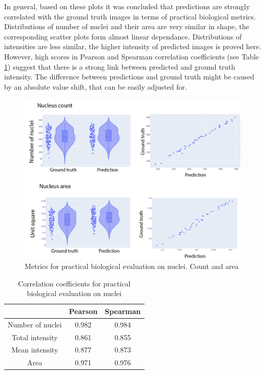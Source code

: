 In general, based on these plots it was concluded that predictions are strongly correlated with the ground truth images in terms of practical biological metrics. Distributions of number of nuclei and their area are very similar in shape, the corresponding scatter plots form almost linear dependance. Distributions of intensities are less similar, the higher intensity of predicted images is proved here. However, high scores in Pearson and Spearman correlation coefficients (see Table \ref{table:nuclei-downstream-metrics-coefficients}) suggest that there is a strong link between predicted and ground truth intensity. The difference between predictions and ground truth might be caused by an absolute value shift, that can be easily adjusted for.

\begin{figure}[htb]
	\begin{center}
		\includegraphics[width=0.8\linewidth]{bilder/nuclei/metric/combined-metrics-1.png}
		\caption{Metrics for practical biological evaluation on nuclei. Count and area}\label{fig:nuclei-downstream-metrics-2}
	\end{center}
\end{figure}

\begin{table}[htb]
    \centering
    \caption{Correlation coefficients for practical biological evaluation on nuclei}
        \begin{adjustbox}{width=0.4\textwidth}
            \begin{tabular}{|c|c|c|}\hline
                &Pearson&Spearman
                \\\hline\hline
                Number of nuclei&0.982&0.984\\\hline
                Total intensity&0.861&0.855\\\hline
                Mean intensity&0.877&0.873\\\hline
                Area&0.971&0.976\\\hline
            \end{tabular}
        \label{table:nuclei-downstream-metrics-coefficients}
        \end{adjustbox}
\end{table}

